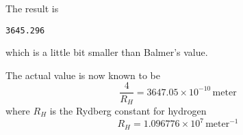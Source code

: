 \documentclass[12pt]{article}
\begin{document}
\noindent
The result is
{\footnotesize
\begin{verbatim}
3645.296 
\end{verbatim}
}

\noindent
which is a little bit smaller than Balmer's value.

\bigskip
\noindent
The actual value is now known to be
\begin{equation*}
\frac{4}{R_H}=3647.05\times10^{-10}\,\text{meter}
\end{equation*}
where $R_H$ is the Rydberg constant for hydrogen
\begin{equation*}
R_H=1.096776\times10^7\,\text{meter}^{-1}
\end{equation*}
\end{document}

